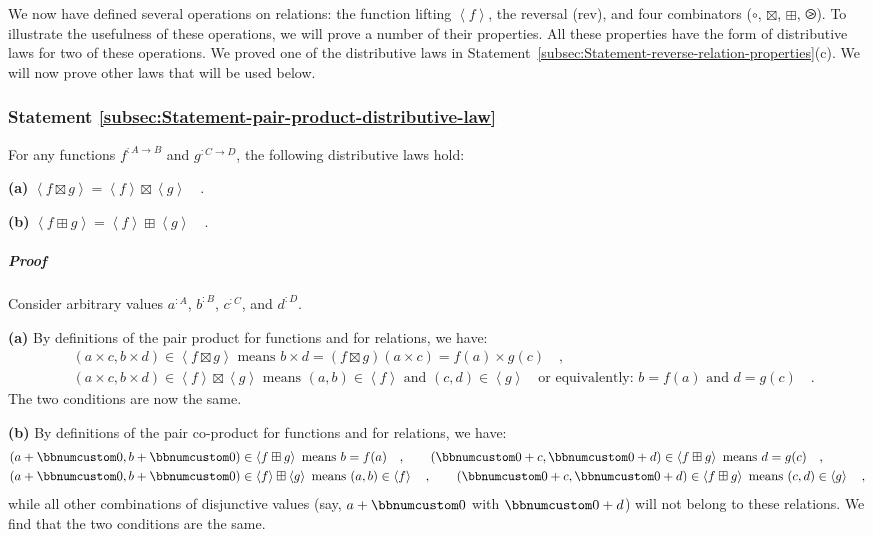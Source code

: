 We now have defined several operations on relations: the function
lifting $\left<f\right>$, the reversal ($\text{rev}$), and four
combinators ($\circ$, $\boxtimes$, $\boxplus$, $\ogreaterthan$).
To illustrate the usefulness of these operations, we will prove a
number of their properties. All these properties have the form of
distributive laws for two of these operations. We proved one of the
distributive laws in Statement~\ref{subsec:Statement-reverse-relation-properties}(c).
We will now prove other laws that will be used below. 

\subsubsection{Statement \label{subsec:Statement-pair-product-distributive-law}\ref{subsec:Statement-pair-product-distributive-law}}

For any functions $f^{:A\rightarrow B}$ and $g^{:C\rightarrow D}$,
the following distributive laws hold:

\textbf{(a)} $\left<f\boxtimes g\right>=\left<f\right>\boxtimes\left<g\right>\quad$.

\textbf{(b)} $\left<f\boxplus g\right>=\left<f\right>\boxplus\left<g\right>\quad$.

\subparagraph{Proof}

Consider arbitrary values $a^{:A}$, $b^{:B}$, $c^{:C}$, and $d^{:D}$.

\textbf{(a)} By definitions of the pair product for functions and
for relations, we have:
\begin{align*}
 & (a\times c,b\times d)\in\left<f\boxtimes g\right>\text{ means }b\times d=(f\boxtimes g)(a\times c)=f(a)\times g(c)\quad,\\
 & (a\times c,b\times d)\in\left<f\right>\boxtimes\left<g\right>\text{ means }(a,b)\in\left<f\right>\text{ and }(c,d)\in\left<g\right>\quad\text{or equivalently}:\,b=f(a)\text{ and }d=g(c)\quad.
\end{align*}
The two conditions are now the same.

\textbf{(b)} By definitions of the pair co-product for functions and
for relations, we have:
\begin{align*}
 & (a+\bbnum 0,b+\bbnum 0)\in\left<f\boxplus g\right>\text{ means }b=f(a)\quad,\quad\quad(\bbnum 0+c,\bbnum 0+d)\in\left<f\boxplus g\right>\text{ means }d=g(c)\quad,\\
 & (a+\bbnum 0,b+\bbnum 0)\in\left<f\right>\boxplus\left<g\right>\text{ means }(a,b)\in\left<f\right>\quad,\quad\quad(\bbnum 0+c,\bbnum 0+d)\in\left<f\boxplus g\right>\text{ means }(c,d)\in\left<g\right>\quad,
\end{align*}
while all other combinations of disjunctive values (say, $a+\bbnum 0$
with $\bbnum 0+d$) will not belong to these relations. We find that
the two conditions are the same.

